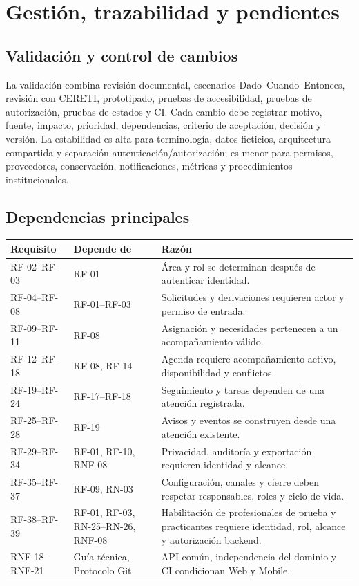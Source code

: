 \documentclass[10pt,a4paper,oneside]{article}
\begin{document}
\section{Gestión, trazabilidad y pendientes}

\subsection{Validación y control de cambios}

La validación combina revisión documental, escenarios Dado--Cuando--Entonces, revisión con CERETI, prototipado, pruebas de accesibilidad, pruebas de autorización, pruebas de estados y CI. Cada cambio debe registrar motivo, fuente, impacto, prioridad, dependencias, criterio de aceptación, decisión y versión. La estabilidad es alta para terminología, datos ficticios, arquitectura compartida y separación autenticación/autorización; es menor para permisos, proveedores, conservación, notificaciones, métricas y procedimientos institucionales.

\subsection{Dependencias principales}

\small
\begin{tabularx}{\textwidth}{@{}L{0.24\textwidth}L{0.22\textwidth}Y@{}}
\toprule\textbf{Requisito} & \textbf{Depende de} & \textbf{Razón}\\\midrule
RF-02--RF-03 & RF-01 & Área y rol se determinan después de autenticar identidad.\\
RF-04--RF-08 & RF-01--RF-03 & Solicitudes y derivaciones requieren actor y permiso de entrada.\\
RF-09--RF-11 & RF-08 & Asignación y necesidades pertenecen a un acompañamiento válido.\\
RF-12--RF-18 & RF-08, RF-14 & Agenda requiere acompañamiento activo, disponibilidad y conflictos.\\
RF-19--RF-24 & RF-17--RF-18 & Seguimiento y tareas dependen de una atención registrada.\\
RF-25--RF-28 & RF-19 & Avisos y eventos se construyen desde una atención existente.\\
RF-29--RF-34 & RF-01, RF-10, RNF-08 & Privacidad, auditoría y exportación requieren identidad y alcance.\\
RF-35--RF-37 & RF-09, RN-03 & Configuración, canales y cierre deben respetar responsables, roles y ciclo de vida.\\
RF-38--RF-39 & RF-01, RF-03, RN-25--RN-26, RNF-08 & Habilitación de profesionales de prueba y practicantes requiere identidad, rol, alcance y autorización backend.\\
RNF-18--RNF-21 & Guía técnica, Protocolo Git & API común, independencia del dominio y CI condicionan Web y Mobile.\\
\bottomrule
\end{tabularx}
\normalsize
\end{document}
